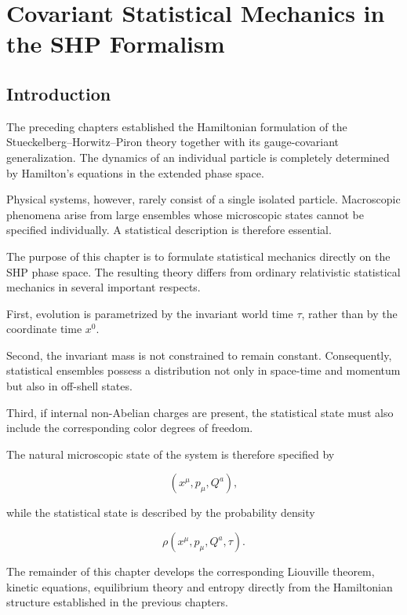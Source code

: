 \chapter{Covariant Statistical Mechanics in the SHP Formalism}

\section{Introduction}

The preceding chapters established the Hamiltonian formulation of the
Stueckelberg--Horwitz--Piron theory together with its gauge-covariant
generalization. The dynamics of an individual particle is completely
determined by Hamilton's equations in the extended phase space.

Physical systems, however, rarely consist of a single isolated particle.
Macroscopic phenomena arise from large ensembles whose microscopic
states cannot be specified individually. A statistical description is
therefore essential.

The purpose of this chapter is to formulate statistical mechanics
directly on the SHP phase space. The resulting theory differs from
ordinary relativistic statistical mechanics in several important
respects.

First, evolution is parametrized by the invariant world time
\(\tau\), rather than by the coordinate time \(x^0\).

Second, the invariant mass is not constrained to remain constant.
Consequently, statistical ensembles possess a distribution not only in
space-time and momentum but also in off-shell states.

Third, if internal non-Abelian charges are present, the statistical
state must also include the corresponding color degrees of freedom.

The natural microscopic state of the system is therefore specified by

\[
(x^\mu,p_\mu,Q^a),
\]

while the statistical state is described by the probability density

\[
\boxed{
\rho(x^\mu,p_\mu,Q^a,\tau).
}
\]

The remainder of this chapter develops the corresponding Liouville
theorem, kinetic equations, equilibrium theory and entropy directly from
the Hamiltonian structure established in the previous chapters.



